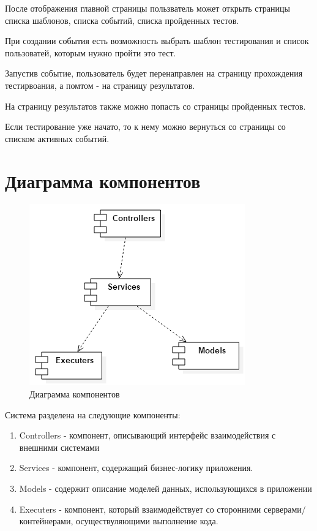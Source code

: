 \documentclass{article}
\begin{document}
    После отображения главной страницы пользватель может
    открыть страницы списка шаблонов, списка событий, списка
    пройденных тестов.

    При создании события есть возможность выбрать шаблон
    тестирования и список пользоватей, которым нужно пройти это
    тест.
    
    Запустив событие, пользователь будет перенаправлен
    на страницу прохождения тестирвоания, а помтом - на страницу
    результатов.
    
    На страницу результатов также можно попасть со страницы
    пройденных тестов.
    
    Если тестирование уже начато, то к нему можно вернуться
    со страницы со списком активных событий.
    \section{Диаграмма компонентов}
    \begin{figure}[H]
        \includegraphics[width=\textwidth, center]
        {ComponentDiagram.png}
        \caption{Диаграмма компонентов}
    \end{figure}
    Система разделена на следующие компоненты:
    \begin{enumerate}
        \item Controllers - компонент, описывающий интерфейс
        взаимодействия с внешними системами
        \item Services - компонент, содержащий бизнес-логику
        приложения.
        \item Models - содержит описание моделей данных,
        использующихся в приложении
        \item Executers - компонент, который взаимодействует
        со сторонними серверами/контейнерами, осуществуляющими
        выполнение кода.
    \end{enumerate}
    
\end{document}
